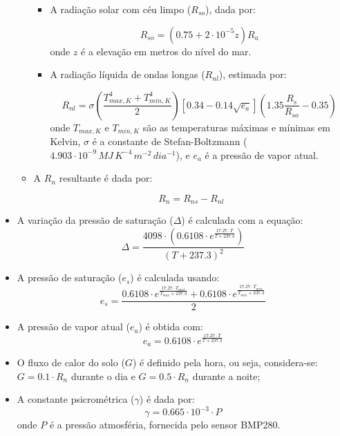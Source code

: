 \begin{itemize}
\begin{itemize}
\begin{itemize}
            \item A radiação solar com céu limpo (\(R_{so}\)), dada por:
            
            \[
            R_{so} = (0.75 + 2 \cdot 10^{-5} z) R_a
            \]
            onde \(z\) é a elevação em metros do nível do mar.
            
            \item A radiação líquida de ondas longas (\(R_{nl}\)), estimada por:
            
            \[
            R_{nl} = \sigma \left( \frac{T_{max,K}^4 + T_{min,K}^4}{2} \right) \left[ 0.34 - 0.14 \sqrt{e_a} \right] \left( 1.35 \frac{R_s}{R_{so}} - 0.35 \right)
            \]
            onde \(T_{max,K}\) e \(T_{min,K}\) são as temperaturas máximas e mínimas em Kelvin, \( \sigma \) é a constante de Stefan-Boltzmann (\(4.903 \cdot 10^{-9} \, MJ \, K^{-4} \, m^{-2} \, dia^{-1} \)), e \(e_a\) é a pressão de vapor atual.
        \end{itemize}

        \item A \(R_n\) resultante é dada por:
        
        \[ R_n = R_{ns} - R_{nl} \]
    \end{itemize}
    
    \item A variação da pressão de saturação (\(\Delta\)) é calculada com a equação:
    \[
    \Delta = \frac{4098 \cdot (0.6108 \cdot e^{\frac{17.27 \cdot T}{T + 237.3}})}{(T + 237.3)^2}
    \]
    
    \item A pressão de saturação (\(e_s\)) é calculada usando:
    \[
    e_s = \frac{0.6108 \cdot e^{\frac{17.27 \cdot T_{max}}{T_{max} + 237.3}} + 0.6108 \cdot e^{\frac{17.27 \cdot T_{min}}{T_{min} + 237.3}}}{2}
    \]
    
    \item A pressão de vapor atual (\(e_a\)) é obtida com:
    \[
    e_a = 0.6108 \cdot e^{\frac{17.27 \cdot T}{T + 237.3}}
    \]
    
    \item O fluxo de calor do solo (\(G\)) é definido pela hora, ou seja, considera-se: \(G = 0.1 \cdot R_n\) durante o dia e \(G = 0.5 \cdot R_n\) durante a noite;
    
    \item A constante psicrométrica (\(\gamma\)) é dada por:
    \[
    \gamma = 0.665 \cdot 10^{-3} \cdot P
    \]
    onde \(P\) é a pressão atmosféria, fornecida pelo sensor BMP280.
\end{itemize}

